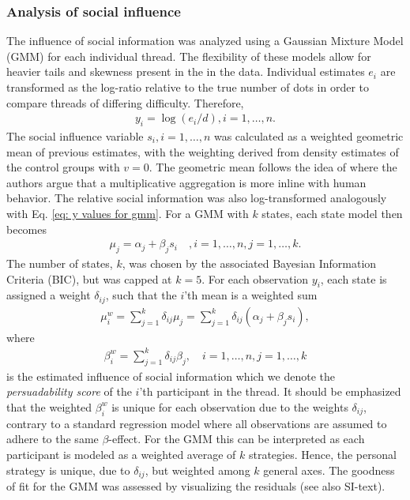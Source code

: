 \documentclass[9pt,a4paper,twocolumn,lineno]{article}
\begin{document}
\subsubsection*{Analysis of social influence}
The influence of social information was analyzed using a Gaussian Mixture Model (GMM) for each individual thread. The flexibility of these models allow for heavier tails and skewness present in the in the data. Individual estimates $e_i$ are transformed as the log-ratio relative to the true number of dots in order to compare threads of differing difficulty. Therefore, 
\begin{align}
	y_i = \log(e_i/d), i=1,\dots,n. \label{eq: y values for gmm}
\end{align}
The social influence variable $s_i, i=1,\dots, n$ was calculated as a weighted geometric mean of previous estimates, with the weighting derived from density estimates of the control groups with $v=0$. The geometric mean follows the idea of \citep{jayles2017social} where the authors argue that a multiplicative aggregation is more inline with human behavior. The relative social information was also log-transformed analogously with Eq. \ref{eq: y values for gmm}.  For a GMM with $k$ states, each state model then becomes
\begin{align}
	\mu_j = \alpha_j+\beta_j s_i \quad, i=1,\dots,n, j=1, \dots,k. \label{eq: mean models}
\end{align}
The number of states, $k$, was chosen by the associated Bayesian Information Criteria (BIC), but was capped at $k=5$. For each observation $y_i$, each state is assigned a weight $\delta_{ij}$, such that the $i$'th mean is a weighted sum
\begin{align}
	\mu^w_i = \sum_{j=1}^k\delta_{ij}\mu_j = \sum_{j=1}^k\delta_{ij}(\alpha_j +\beta_j s_i),
\end{align}
where 
\begin{align}
	\beta^w_i = \sum_{j=1}^k \delta_{ij}\beta_j, \quad i=1,\dots, n, j=1,\dots,k \label{eq: weighted beta}
\end{align}
is the estimated influence of social information which we denote the \emph{persuadability score} of the $i$'th participant in the thread. It should be emphasized that the weighted $\beta^w_i$ is unique for each observation due to the weights $\delta_{ij}$, contrary to a standard regression model where all observations are assumed to adhere to the same $\beta$-effect. For the GMM this can be interpreted as each participant is modeled as a weighted average of $k$ strategies. Hence, the personal strategy is unique, due to $\delta_{ij}$, but weighted among $k$ general axes. The goodness of fit for the GMM was assessed by visualizing the residuals (see also SI-text). 
\end{document}
